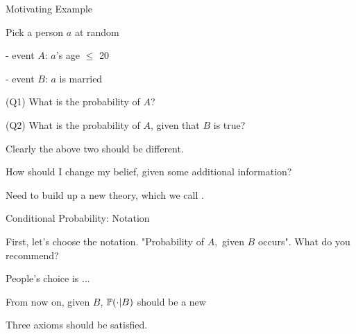\documentclass[fleqn,aspectratio=169]{beamer}
\begin{document}
\begin{frame}{Motivating Example}

\plitemsep 0.1in
\bci 

\item<1-> Pick a person $a$ at random

- event $A$: $a$'s age $\leq$ 20

- event $B$: $a$ is married


\item<2-> (Q1) What is the probability of $A$?

\item<2-> (Q2) What is the probability of $A$, given that $B$ is true?

\item<2-> Clearly the above two should be different. 

\item<3->  How should I change my belief, given some additional information?

\item<4-> Need to build up a new theory, which we call .

\eci 

\end{frame}

\begin{frame}{Conditional Probability: Notation}

\bci

\item<1-> First, let's choose the notation. "Probability of $A,$ given $B$ occurs". What do you recommend?

\item<3-> People's choice is ... 

\item<5-> From now on, given $B$, $\mathbb{P}( \cdot | B )$ should be a new 
\bci
\item Three axioms  should be satisfied.
\eci

\eci 

\end{frame}
\end{document}
